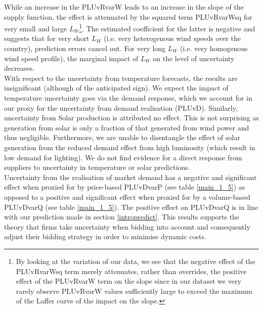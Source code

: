 While an increase in the PLUvRvarW leads to an increase in the slope of the supply function, the effect is attenuated by the squared term PLUvRvarWsq 
for very small and large $L_W$\footnote{By looking at the variation of our data, we see that the negative effect of the PLUvRvarWsq term merely attenuates, rather than overrides, the positive effect of the PLUvRvarW term on the slope since in our dataset we very rarely observe PLUvRvarW values sufficiently large to exceed the maximum of the Laffer curve of the impact on the slope.}. The estimated coefficient for the latter is negative and suggests that for very short $L_W$ (i.e. very heterogenous wind speeds over the country), prediction errors cancel out. For very long $L_W$ (i.e. very homogenous wind speed profile), the marginal impact of $L_W$ on the level of uncertainty decreases. \\


With respect to the uncertainty from temperature forecasts, the results are insignificant (although of the anticipated sign). We expect the impact of temperature uncertainty goes via the demand response, which we account for in our proxy for the uncertainty from demand realisation (PLUvD). Similarly, uncertainty from Solar production is attributed no effect. This is not surprising as 
generation from solar is only a fraction of that generated from wind power and thus negligible.
Furthermore, we are unable to disentangle the effect of solar generation from the reduced demand effect from high luminosity (which result in low demand for lighting). We do not find evidence for a direct response from suppliers to uncertainty in temperature or solar predictions. \\

Uncertainty from the realisation of market demand has a negative and significant effect when proxied for by price-based PLUvDvarP (see table \ref{main_1_5}) as opposed to a positive and significant effect when proxied for by a volume-based PLUvDvarQ (see table \ref{main_1_5}). 
The positive effect on PLUvDvarQ is in line with our prediction made in section \ref{intropredict}. This results supports the theory that firms take uncertainty when bidding into account and consequently adjust their bidding strategy in order to minimise dynamic costs. \\

